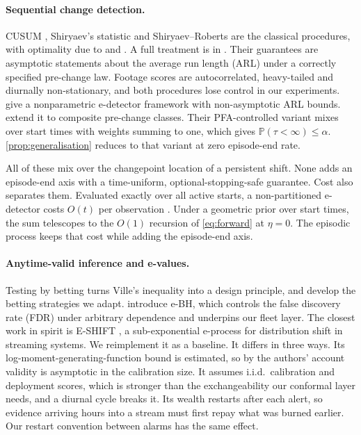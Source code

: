 \paragraph{Sequential change detection.}
CUSUM \citep{page1954}, Shiryaev's statistic \citep{shiryaev1963} and
Shiryaev--Roberts \citep{roberts1966} are the classical procedures, with optimality
due to \citet{lorden1971} and \citet{moustakides1986}. A full treatment is in
\citet{tartakovsky2014sequential}. Their guarantees are asymptotic
statements about the average run length (ARL) under a correctly specified pre-change law. Footage
scores are autocorrelated, heavy-tailed and diurnally non-stationary, and both
procedures lose control in our experiments. \citet{shin2024edetectors} give a
nonparametric e-detector framework with non-asymptotic ARL bounds. \citet{saha2026nonpartitioned}
extend it to composite pre-change classes. Their PFA-controlled variant mixes over
start times with weights summing to one, which gives $\mathbb{P}(\tau<\infty)\le\alpha$.
\cref{prop:generalisation} reduces to that variant at zero episode-end rate.

All of these mix over the changepoint location of a persistent shift. None adds an
episode-end axis with a time-uniform, optional-stopping-safe guarantee. Cost also
separates them. Evaluated exactly over all active starts, a non-partitioned
e-detector costs $O(t)$ per observation \citep{saha2026nonpartitioned}. Under a
geometric prior over start times, the sum telescopes to the $O(1)$ recursion of
\cref{eq:forward} at $\eta=0$. The episodic process keeps that cost while adding the
episode-end axis.

\paragraph{Anytime-valid inference and e-values.}
Testing by betting \citep{shafer2021testing} turns Ville's inequality into a design
principle, and \citet{waudby2024betting} develop the betting strategies we adapt.
\citet{wang2022ebh} introduce e-BH, which controls the false discovery rate (FDR) under
arbitrary dependence and underpins our fleet layer. The closest work in spirit is
E-SHIFT \citep{khan2026eshift}, a sub-exponential e-process for distribution shift
in streaming systems. We reimplement it as a baseline. It differs in three ways.
Its log-moment-generating-function bound is estimated, so by the authors' account
validity is asymptotic in the calibration size. It assumes i.i.d.\ calibration and
deployment scores, which is stronger than the exchangeability our conformal layer
needs, and a diurnal cycle breaks it. Its wealth restarts after each alert, so
evidence arriving hours into a stream must first repay what was burned earlier. Our
restart convention between alarms has the same effect.

